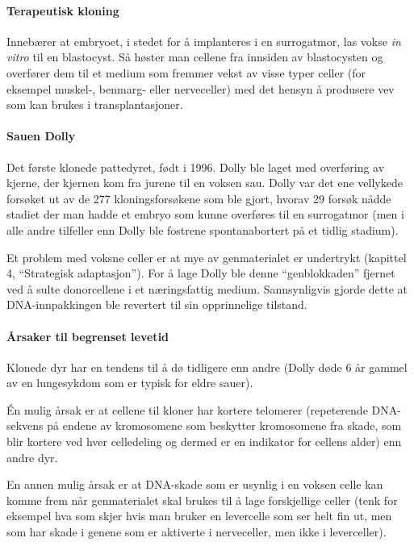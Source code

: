 \paragraph{Terapeutisk kloning} Innebærer at embryoet, i stedet for å implanteres i en surrogatmor, las vokse \emph{in vitro} til en blastocyst. Så høster man cellene fra innsiden av blastocysten og overfører dem til et medium som fremmer vekst av visse typer celler (for eksempel muskel-, benmarg- eller nerveceller) med det hensyn å produsere vev som kan brukes i transplantasjoner.

\paragraph{Sauen Dolly} Det første klonede pattedyret, født i 1996. Dolly ble laget med overføring av kjerne, der kjernen kom fra jurene til en voksen sau. Dolly var det ene vellykede forsøket ut av de 277 kloningsforsøkene som ble gjort, hvorav 29 forsøk nådde stadiet der man hadde et embryo som kunne overføres til en surrogatmor (men i alle andre tilfeller enn Dolly ble fostrene spontanabortert på et tidlig stadium). 

Et problem med voksne celler er at mye av genmaterialet er undertrykt (kapittel 4, ``Strategisk adaptasjon''). For å lage Dolly ble denne ``genblokkaden'' fjernet ved å sulte donorcellene i et næringsfattig medium. Sannsynligvis gjorde dette at DNA-innpakkingen ble revertert til sin opprinnelige tilstand.

\paragraph{Årsaker til begrenset levetid} Klonede dyr har en tendens til å dø tidligere enn andre (Dolly døde 6 år gammel av en lungesykdom som er typisk for eldre sauer).

Én mulig årsak er at cellene til kloner har kortere telomerer  (repeterende DNA-sekvens på endene av kromosomene som beskytter kromosomene fra skade, som blir kortere ved hver celledeling og dermed er en indikator for cellens alder) enn andre dyr. 

En annen mulig årsak er at DNA-skade som er usynlig i en voksen celle kan komme frem når genmaterialet skal brukes til å lage forskjellige celler (tenk for eksempel hva som skjer hvis man bruker en levercelle som ser helt fin ut, men som har skade i genene som er aktiverte i nerveceller, men ikke i leverceller).

